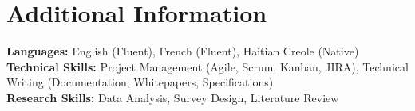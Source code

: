 \documentclass[letterpaper,11pt]{article}
\begin{document}
\section{Additional Information}
 \begin{itemize}[leftmargin=0.15in, label={}]
    \small{\item{
     \textbf{Languages:} {English (Fluent), French (Fluent), Haitian Creole (Native)} \\
     \textbf{Technical Skills:} {Project Management (Agile, Scrum, Kanban, JIRA), Technical Writing (Documentation, Whitepapers, Specifications)} \\
     \textbf{Research Skills:} {Data Analysis, Survey Design, Literature Review} \\
    }}
 \end{itemize}
 \vspace{-16pt}
\end{document}
